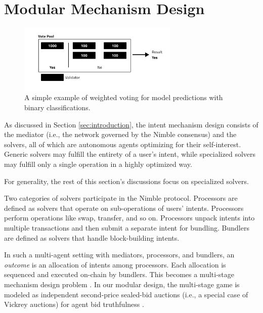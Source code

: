 \documentclass[11pt,letterpaper,twocolumn]{article}
\begin{document}
\section{Modular Mechanism Design}
\label{sec:mechanism}

\begin{figure}[t]
\centering
\includegraphics[width=3in]{fig/weighted-voting-hr.png}
\caption{A simple example of weighted voting for model predictions with binary classifications.} 
\label{fig:weighted-voting}
\vspace{0pt}
\end{figure}

As discussed in Section \ref{sec:introduction}, the intent mechanism design consists of the mediator (i.e., the network governed by
the Nimble consensus) and the solvers, all of which are autonomous agents optimizing for their self-interest. Generic
solvers may fulfill the entirety of a user’s
intent, while specialized solvers may fulfill only a single operation in a highly optimized way.

For generality, the rest of this section's discussions focus on specialized solvers.

Two categories of solvers participate in the Nimble protocol. Processors are defined as
solvers that operate on sub-operations of users' intents. Processors perform operations like swap, transfer, and so on.
Processors unpack intents into multiple transactions and then submit a separate intent for bundling.
Bundlers are defined as solvers that handle block-building
intents.

In such a multi-agent setting with mediators, processors, and bundlers, an \emph{outcome} is an allocation of intents among
processors. Each allocation is sequenced and executed on-chain by
bundlers. This becomes a multi-stage mechanism design problem
\cite{myerson1986multistage, jurca2009mechanisms, curry2023automated, sandholm2007automated, hajiaghayi2007automated, gan2022sequential}. In our modular design, the multi-stage game is modeled as independent second-price sealed-bid auctions (i.e., a special
case of Vickrey auctions) for agent bid truthfulness
\cite{laffont1980optimal, ausubel1999generalized}.
\end{document}
